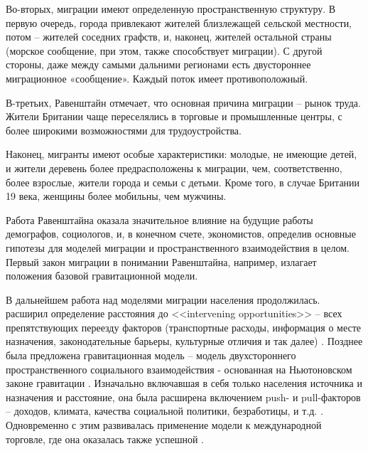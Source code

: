 \documentclass[a4paper,12pt]{article}
\begin{document}
Во-вторых, миграции имеют определенную пространственную структуру. В первую очередь, города привлекают жителей близлежащей сельской местности, потом – жителей соседних графств, и, наконец, жителей остальной страны (морское сообщение, при этом, также способствует миграции). С другой стороны, даже между самыми дальними регионами есть двустороннее миграционное «сообщение». Каждый поток имеет противоположный.

В-третьих, Равенштайн отмечает, что основная причина миграции – рынок труда. Жители Британии чаще переселялись в торговые и промышленные центры, с более широкими возможностями для трудоустройства.

Наконец, мигранты имеют особые характеристики: молодые, не имеющие детей, и жители деревень более предрасположены к миграции, чем, соответственно, более взрослые, жители города и семьи с детьми. Кроме того, в случае Британии 19 века, женщины более мобильны, чем мужчины. 

Работа Равенштайна оказала значительное влияние на будущие работы демографов, социологов, и, в конечном счете, экономистов, определив основные гипотезы для моделей миграции и пространственного взаимодействия в целом. Первый закон миграции в понимании Равенштайна, например, излагает положения базовой гравитационной модели.

В дальнейшем работа над моделями миграции населения продолжилась. \citeauthor{stouffer_intervening_1940} расширил определение расстояния до <<intervening opportunities>> -- всех препятствующих переезду факторов (транспортные расходы, информация о месте назначения, законодательные барьеры, культурные отличия и так далее) \citep{stouffer_intervening_1940}. Позднее была предложена гравитационная модель -- модель двухстороннего пространственного социального взаимодействия - основанная на Ньютоновском законе гравитации \citep{stewart_demographic_1948, zipf_p1_1946}. Изначально включавшая в себя только населения источника и назначения и расстояние, она была расширена включением push- и pull-факторов -- доходов, климата, качества социальной политики, безработицы, и т.д. \citep{lee_theory_1966}. 
Одновременно с этим развивалась применение модели к международной торговле, где она оказалась также успешной \citep{de_benedictis_gravity_2011}.
\end{document}

